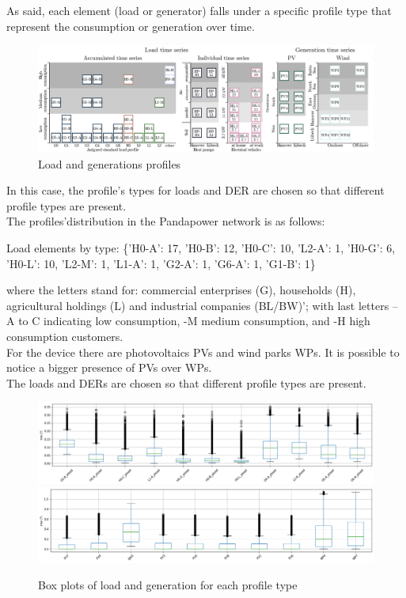As said, each element (load or generator) falls under a specific profile type that represent the consumption or generation over time.

\begin{figure}[H]
\centering
    \includegraphics[width=.8\linewidth]{images/MVOberr/SimBench load and generation time series.PNG}
\caption{Load and generations profiles}
\label{fig:gym_anm_net}
\end{figure}

In this case, the profile's types for loads and \gls{DER} are chosen so that different profile types are present. \\
The profiles'distribution in the Pandapower network is as follows:

\begin{algorithm}[h]
\State Load elements by type: \{'H0-A': 17, 'H0-B': 12, 'H0-C': 10, 'L2-A': 1, 'H0-G': 6, 'H0-L': 10, 'L2-M': 1, 'L1-A': 1, 'G2-A': 1, 'G6-A': 1, 'G1-B': 1\}

\end{algorithm}
\noindent where the letters stand for: commercial enterprises (G), households (H), agricultural holdings (L) and industrial companies (BL/BW)'; with last letters –A to C indicating low consumption, -M medium consumption, and -H high consumption customers. \\
For the  device there are photovoltaics \glspl{PV} and wind parks \glspl{WP}. It is possible to notice a bigger presence of \glspl{PV} over \glspl{WP}.\\

The loads and \glspl{DER} are chosen so that different profile types are present.



\begin{figure}[H]
\centering
    \includegraphics[width=.8\linewidth]{images/MVOberr/BoxPlotLoad.png}
    \includegraphics[width=.8\linewidth]{images/MVOberr/BoxPlotRes.png}
\caption{Box plots of load and generation for each profile type}
\label{fig:gym_anm_net}
\end{figure}

